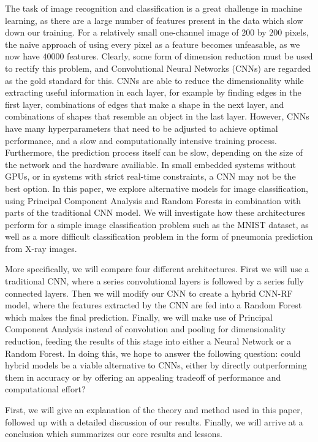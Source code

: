 \documentclass[onecolumn,10pt,cleanfoot]{asme2ej}
\begin{document}
The task of image recognition and classification is a great challenge in machine learning, as there are a large number of features present in the data which slow down our training. For a relatively small one-channel image of $200$ by $200$ pixels, the naive approach of using every pixel as a feature becomes unfeasable, as we now have $40000$ features. Clearly, some form of dimension reduction must be used to rectify this problem, and Convolutional Neural Networks (CNNs) are regarded as the gold standard for this. CNNs are able to reduce the dimensionality while extracting useful information in each layer, for example by finding edges in the first layer, combinations of edges that make a shape in the next layer, and combinations of shapes that resemble an object in the last layer. However, CNNs have many hyperparameters that need to be adjusted to achieve optimal performance, and a slow and computationally intensive training process. Furthermore, the prediction process itself can be slow, depending on the size of the network and the hardware availiable. In small embedded systems without GPUs, or in systems with strict real-time constraints, a CNN may not be the best option. In this paper, we explore alternative models for image classification, using Principal Component Analysis and Random Forests in combination with parts of the traditional CNN model. We will investigate how these architectures perform for a simple image classification problem such as the MNIST dataset, as well as a more difficult classification problem in the form of pneumonia prediction from X-ray images. 

More specifically, we will compare four different architectures. First we will use a traditional CNN, where a series convolutional layers is followed by a series fully connected layers. Then we will modify our CNN to create a hybrid CNN-RF model, where the features extracted by the CNN are fed into a Random Forest which makes the final prediction. Finally, we will make use of Principal Component Analysis instead of convolution and pooling for dimensionality reduction, feeding the results of this stage into either a Neural Network or a Random Forest. In doing this, we hope to answer the following question: could hybrid models be a viable alternative to CNNs, either by directly outperforming them in accuracy or by offering an appealing tradeoff of performance and computational effort?

First, we will give an explanation of the theory and method used in this paper, followed up with a detailed discussion of our results. Finally, we will arrive at a conclusion which summarizes our core results and lessons.
\end{document}
